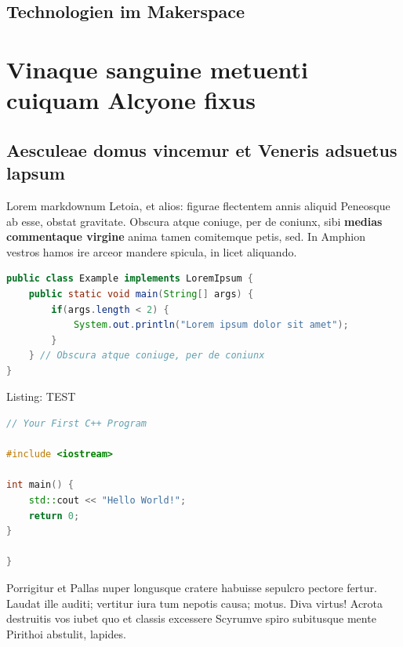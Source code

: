 \hypertarget{technologien-im-makerspace}{%
\subsection{Technologien im
Makerspace}\label{technologien-im-makerspace}}

\hypertarget{section}{%
\subsection{}\label{section}}

\hypertarget{vinaque-sanguine-metuenti-cuiquam-alcyone-fixus}{%
\section{Vinaque sanguine metuenti cuiquam Alcyone
fixus}\label{vinaque-sanguine-metuenti-cuiquam-alcyone-fixus}}

\hypertarget{aesculeae-domus-vincemur-et-veneris-adsuetus-lapsum}{%
\subsection{Aesculeae domus vincemur et Veneris adsuetus
lapsum}\label{aesculeae-domus-vincemur-et-veneris-adsuetus-lapsum}}

Lorem markdownum Letoia, et alios: figurae flectentem annis aliquid
Peneosque ab esse, obstat gravitate. Obscura atque coniuge, per de
coniunx, sibi \textbf{medias commentaque virgine} anima tamen comitemque
petis, sed. In Amphion vestros hamos ire arceor mandere spicula, in
licet aliquando.

\begin{lstlisting}[language=Java]
public class Example implements LoremIpsum {
    public static void main(String[] args) {
        if(args.length < 2) {
            System.out.println("Lorem ipsum dolor sit amet");
        }
    } // Obscura atque coniuge, per de coniunx
}
\end{lstlisting}

Listing: TEST

\begin{lstlisting}[language={C++}]
// Your First C++ Program

#include <iostream>

int main() {
    std::cout << "Hello World!";
    return 0;
}

}
\end{lstlisting}

Porrigitur et Pallas nuper longusque cratere habuisse sepulcro pectore
fertur. Laudat ille auditi; vertitur iura tum nepotis causa; motus. Diva
virtus! Acrota destruitis vos iubet quo et classis excessere Scyrumve
spiro subitusque mente Pirithoi abstulit, lapides.

